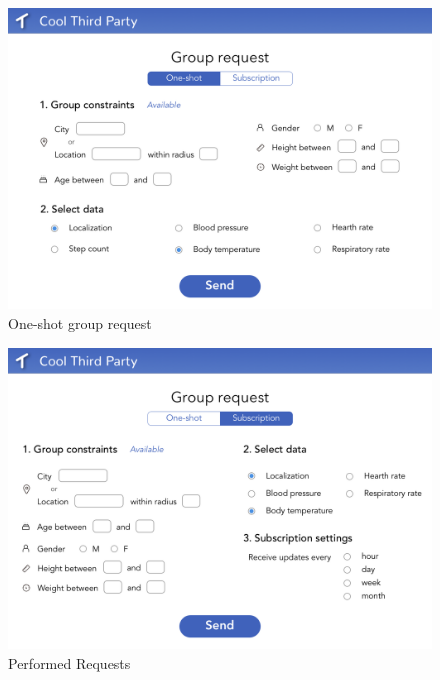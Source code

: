 \begin{figure}[H]
    \centering
    \includegraphics[scale=0.2]{rasdL/Pictures/Mockup/web/group1.png}
    \caption{One-shot group request}
\end{figure}
\begin{figure}[H]
    \centering
    \includegraphics[scale=0.2]{rasdL/Pictures/Mockup/web/group2.png}
    \caption{Performed Requests}
\end{figure}




